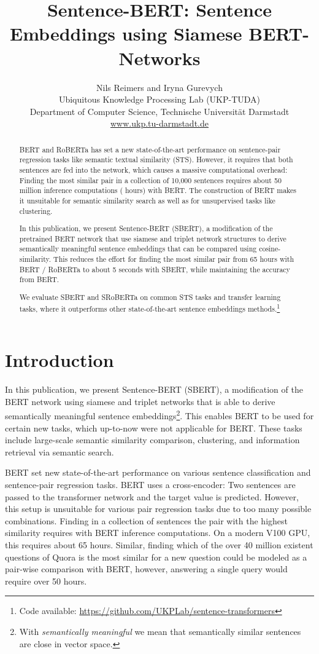 \documentclass[11pt,a4paper]{article}
\title{Sentence-BERT: Sentence Embeddings using Siamese BERT-Networks}
\author{Nils Reimers and Iryna Gurevych \\
Ubiquitous Knowledge Processing Lab (UKP-TUDA)\\
Department of Computer Science, Technische Universit\"at Darmstadt\\
\url{www.ukp.tu-darmstadt.de}}
\date{}
\begin{document}
\maketitle
\begin{abstract}
BERT \cite{devlin2018bert} and RoBERTa  \cite{roberta} has set a new state-of-the-art performance on sentence-pair regression tasks like semantic textual similarity (STS). However, it requires that both sentences are fed into the network, which causes a massive computational overhead: Finding the most similar pair in a collection of 10,000 sentences requires about 50 million inference computations ( hours) with BERT. The construction of BERT makes it unsuitable for semantic similarity search as well as for unsupervised tasks like clustering. 

In this publication, we present Sentence-BERT (SBERT), a modification of the pretrained BERT network that use siamese and triplet network structures to derive semantically meaningful sentence embeddings that can be compared using cosine-similarity. This reduces the effort for finding the most similar pair from 65 hours with BERT / RoBERTa to about 5 seconds with SBERT, while maintaining the accuracy from BERT.

We evaluate SBERT and SRoBERTa on common STS tasks and transfer learning tasks, where it outperforms other state-of-the-art sentence embeddings methods.\footnote{Code available: \url{https://github.com/UKPLab/sentence-transformers}}
\end{abstract}



\section{Introduction}
In this publication, we present Sentence-BERT (SBERT), a modification of the BERT network using siamese and triplet networks that is able to derive semantically meaningful sentence embeddings\footnote{With \textit{semantically meaningful} we mean that semantically similar sentences are close in vector space.}. This enables BERT to be used for certain new tasks, which up-to-now were not applicable for BERT. These tasks include large-scale semantic similarity comparison, clustering, and information retrieval via semantic search.



BERT set new state-of-the-art performance on various sentence classification and sentence-pair regression tasks. BERT uses a cross-encoder: Two sentences are passed to the transformer network and the target value is predicted. However, this setup is unsuitable for various pair regression tasks due to too many possible combinations. Finding in a collection of  sentences the pair with the highest similarity requires with BERT  inference computations. On a modern  V100 GPU, this requires about 65 hours. Similar, finding which of the over 40 million existent questions of Quora is the most similar for a new question could be modeled as a pair-wise comparison with BERT, however, answering a single query would require over 50 hours.
\end{document}
